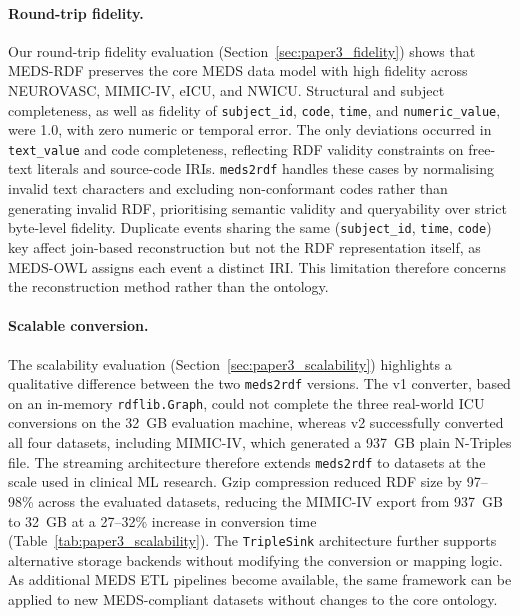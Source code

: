 \paragraph{Round-trip fidelity.}
Our round-trip fidelity evaluation (Section~\ref{sec:paper3_fidelity}) shows that MEDS-RDF preserves the core MEDS data model with high fidelity across NEUROVASC, MIMIC-IV, eICU, and NWICU. Structural and subject completeness, as well as fidelity of \texttt{subject\_id}, \texttt{code}, \texttt{time}, and \texttt{numeric\_value}, were 1.0, with zero numeric or temporal error. The only deviations occurred in \texttt{text\_value} and code completeness, reflecting RDF validity constraints on free-text literals and source-code IRIs. \texttt{meds2rdf} handles these cases by normalising invalid text characters and excluding non-conformant codes rather than generating invalid RDF, prioritising semantic validity and queryability over strict byte-level fidelity. Duplicate events sharing the same (\texttt{subject\_id}, \texttt{time}, \texttt{code}) key affect join-based reconstruction but not the RDF representation itself, as MEDS-OWL assigns each event a distinct IRI. This limitation therefore concerns the reconstruction method rather than the ontology.

\paragraph{Scalable conversion.}
The scalability evaluation (Section~\ref{sec:paper3_scalability}) highlights a qualitative difference between the two \texttt{meds2rdf} versions. The v1 converter, based on an in-memory \texttt{rdflib.Graph}, could not complete the three real-world ICU conversions on the 32~GB evaluation machine, whereas v2 successfully converted all four datasets, including MIMIC-IV, which generated a 937~GB plain N-Triples file. The streaming architecture therefore extends \texttt{meds2rdf} to datasets at the scale used in clinical ML research. Gzip compression reduced RDF size by 97--98\% across the evaluated datasets, reducing the MIMIC-IV export from 937~GB to 32~GB at a 27--32\% increase in conversion time (Table~\ref{tab:paper3_scalability}). The \texttt{TripleSink} architecture further supports alternative storage backends without modifying the conversion or mapping logic. As additional MEDS ETL pipelines become available, the same framework can be applied to new MEDS-compliant datasets without changes to the core ontology.

